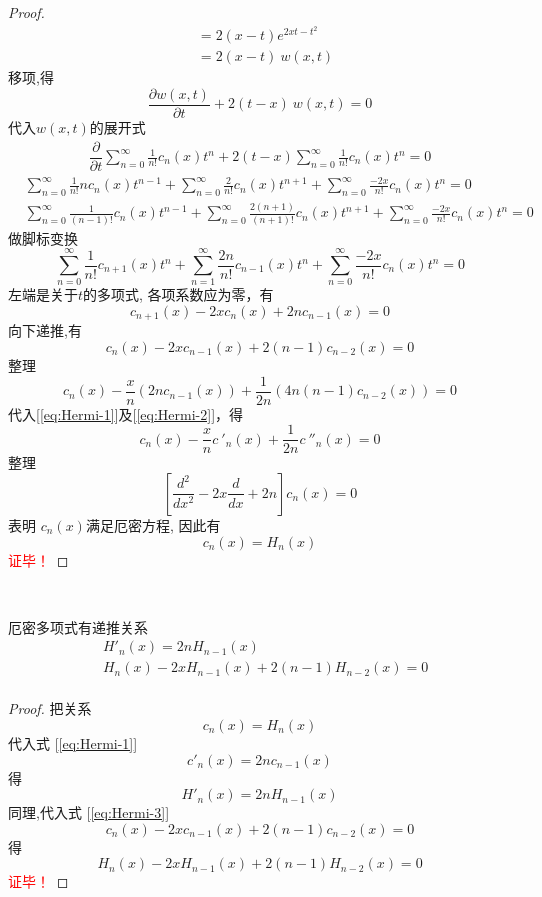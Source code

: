 \begin{proof}
$$\begin{aligned}
	&= 2(x-t) e^{2xt-t^2}  \\ 
	&= 2(x-t) ~w(x,t) 
\end{aligned}
$$
移项,得   
$$  \dfrac{\partial w(x,t)}{\partial t} +2(t-x) ~w(x,t) =0$$  
代入$w(x,t)$的展开式 
$$
\begin{aligned}
	 \dfrac{\partial}{\partial t} \sum_{n=0}^{\infty} \frac{1}{n!}  c_n(x) t^n +2(t-x) \sum_{n=0}^{\infty} \frac{1}{n!}  c_n(x) t^n = 0 
\end{aligned}
$$ 
$$
\begin{aligned}
	 &\sum_{n=0}^{\infty} \frac{1}{n!} n c_n(x) t^{n-1} + \sum_{n=0}^{\infty} \frac{2}{n!}  c_n(x) t^{n+1} + \sum_{n=0}^{\infty} \frac{-2x}{n!}  c_n(x) t^n = 0 \\
	 &\sum_{n=0}^{\infty} \frac{1}{(n-1)!} c_n(x) t^{n-1} + \sum_{n=0}^{\infty} \frac{2(n+1)}{(n+1)!}  c_n(x) t^{n+1} + \sum_{n=0}^{\infty} \frac{-2x}{n!}  c_n(x) t^n = 0 
\end{aligned}
$$ 
做脚标变换
$$
\sum\limits_{n=0}^{\infty} \dfrac{1}{n!} c_{n+1}(x) t^{n} +\sum\limits_{n=1}^{\infty}\dfrac{2n}{n!} c_{n-1}(x)t^n +\sum\limits_{n=0}^{\infty} \dfrac{-2x}{n!} c_n(x)t^n =0   
$$ 
左端是关于$t$的多项式, 各项系数应为零，有
$$ c_{n+1}(x) -2xc_n(x) +2nc_{n-1} (x) =0 $$ 
向下递推,有
\begin{equation}\label{eq:Hermi-3}
	c_{n}(x) -2xc_{n-1}(x) +2(n-1)c_{n-2} (x) =0	
\end{equation}
整理
$$  c_{n}(x) - \dfrac{x}{n} (2n c_{n-1} (x))  +\dfrac{1}{2n} (4n(n-1) c_{n-2} (x)) =0 $$ 
代入[\ref{eq:Hermi-1}]及[\ref{eq:Hermi-2}]，得
$$  c_{n}(x) - \dfrac{x}{n}c~'_{n}(x) +\dfrac{1}{2n}c~''_{n} (x) =0 $$ 
整理
\begin{equation*}
	 \left[  \dfrac{d^2}{dx^2} -2x\frac{d}{dx} +2n  \right] c_n(x)=0 
\end{equation*}
表明 $c_n(x)$满足厄密方程, 因此有  
$$ c_n(x)= H_n (x)  $$ 
\textcolor{red}{证毕！}
\end{proof}

~~\\ 

\begin{proposition}
厄密多项式有递推关系
\begin{equation}
	\begin{aligned}
		& H'_n(x)=2nH_{n-1}(x) \\ 
		& H_{n}(x) -2xH_{n-1}(x) +2(n-1)H_{n-2} (x) =0  \\ 
	\end{aligned}
\end{equation}
\end{proposition}
\begin{proof}
把关系
$$ c_n(x)= H_n (x)  $$  
代入式 [\ref{eq:Hermi-1}]
\begin{equation*}
	c'_n (x)=2n c_{n-1} (x)	
\end{equation*}
得
$$
H'_n(x)=2nH_{n-1}(x)  
$$ 
同理,代入式 [\ref{eq:Hermi-3}]
\begin{equation*}
	c_{n}(x) -2xc_{n-1}(x) +2(n-1)c_{n-2} (x) =0	
\end{equation*}
得
$$
H_{n}(x) -2xH_{n-1}(x) +2(n-1)H_{n-2} (x) =0  
$$ 
\textcolor{red}{证毕！}
\end{proof}
~~\\ 

